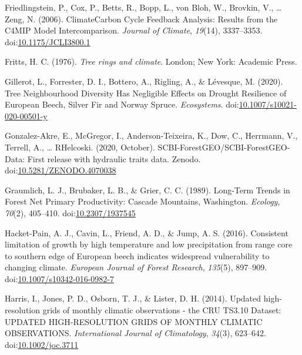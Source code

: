 \documentclass[
]{article}
\newlength{\cslhangindent}
\newenvironment{cslreferences}%
  {\setlength{\parindent}{0pt}%
  \everypar{\setlength{\hangindent}{\cslhangindent}}\ignorespaces}%
  {\par}
\begin{document}
\begin{cslreferences}
\leavevmode\hypertarget{ref-friedlingstein_climatecarbon_2006}{}%
Friedlingstein, P., Cox, P., Betts, R., Bopp, L., von Bloh, W., Brovkin,
V., \ldots{} Zeng, N. (2006). ClimateCarbon Cycle Feedback Analysis:
Results from the C4MIP Model Intercomparison. \emph{Journal of Climate},
\emph{19}(14), 3337--3353.
doi:\href{https://doi.org/10.1175/JCLI3800.1}{10.1175/JCLI3800.1}

\leavevmode\hypertarget{ref-fritts_tree_1976}{}%
Fritts, H. C. (1976). \emph{Tree rings and climate}. London; New York:
Academic Press.

\leavevmode\hypertarget{ref-gillerot_tree_2020}{}%
Gillerot, L., Forrester, D. I., Bottero, A., Rigling, A., \& Lévesque,
M. (2020). Tree Neighbourhood Diversity Has Negligible Effects on
Drought Resilience of European Beech, Silver Fir and Norway Spruce.
\emph{Ecosystems}.
doi:\href{https://doi.org/10.1007/s10021-020-00501-y}{10.1007/s10021-020-00501-y}

\leavevmode\hypertarget{ref-gonzalez-akre_scbi-forestgeoscbi-forestgeo-data_2020-1}{}%
Gonzalez-Akre, E., McGregor, I., Anderson-Teixeira, K., Dow, C.,
Herrmann, V., Terrell, A., \ldots{} RHelcoski. (2020, October).
SCBI-ForestGEO/SCBI-ForestGEO-Data: First release with hydraulic traits
data. Zenodo.
doi:\href{https://doi.org/10.5281/ZENODO.4070038}{10.5281/ZENODO.4070038}

\leavevmode\hypertarget{ref-graumlich_long-term_1989}{}%
Graumlich, L. J., Brubaker, L. B., \& Grier, C. C. (1989). Long-Term
Trends in Forest Net Primary Productivity: Cascade Mountains,
Washington. \emph{Ecology}, \emph{70}(2), 405--410.
doi:\href{https://doi.org/10.2307/1937545}{10.2307/1937545}

\leavevmode\hypertarget{ref-hacket-pain_consistent_2016}{}%
Hacket-Pain, A. J., Cavin, L., Friend, A. D., \& Jump, A. S. (2016).
Consistent limitation of growth by high temperature and low
precipitation from range core to southern edge of European beech
indicates widespread vulnerability to changing climate. \emph{European
Journal of Forest Research}, \emph{135}(5), 897--909.
doi:\href{https://doi.org/10.1007/s10342-016-0982-7}{10.1007/s10342-016-0982-7}

\leavevmode\hypertarget{ref-harris_updated_2014}{}%
Harris, I., Jones, P. D., Osborn, T. J., \& Lister, D. H. (2014).
Updated high-resolution grids of monthly climatic observations - the CRU
TS3.10 Dataset: UPDATED HIGH-RESOLUTION GRIDS OF MONTHLY CLIMATIC
OBSERVATIONS. \emph{International Journal of Climatology}, \emph{34}(3),
623--642. doi:\href{https://doi.org/10.1002/joc.3711}{10.1002/joc.3711}


\end{cslreferences}
\end{document}
